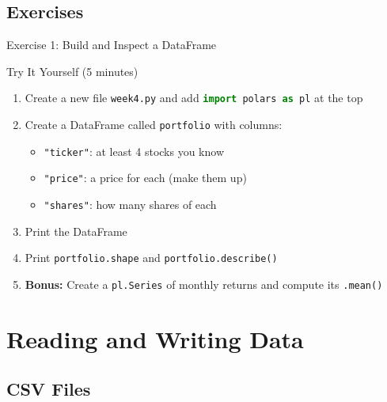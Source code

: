 \documentclass[9pt,aspectratio=169]{beamer}
\newcommand{\py}[1]{\lstinline[language=Python]{#1}}
\begin{document}
\subsection{Exercises}
\begin{frame}[fragile]{Exercise 1: Build and Inspect a DataFrame}

\begin{alertblock}{Try It Yourself (5 minutes)}
\begin{enumerate}
    \item Create a new file \texttt{week4.py} and add \py{import polars as pl} at the top
    \item Create a DataFrame called \texttt{portfolio} with columns:
    \begin{itemize}
        \item \texttt{"ticker"}: at least 4 stocks you know
        \item \texttt{"price"}: a price for each (make them up)
        \item \texttt{"shares"}: how many shares of each
    \end{itemize}
    \item Print the DataFrame
    \item Print \py{portfolio.shape} and \py{portfolio.describe()}
    \item \textbf{Bonus:} Create a \py{pl.Series} of monthly returns and compute its \py{.mean()}
\end{enumerate}
\end{alertblock}

\end{frame}


\section{Reading and Writing Data}
\subsection{CSV Files}
\end{document}
